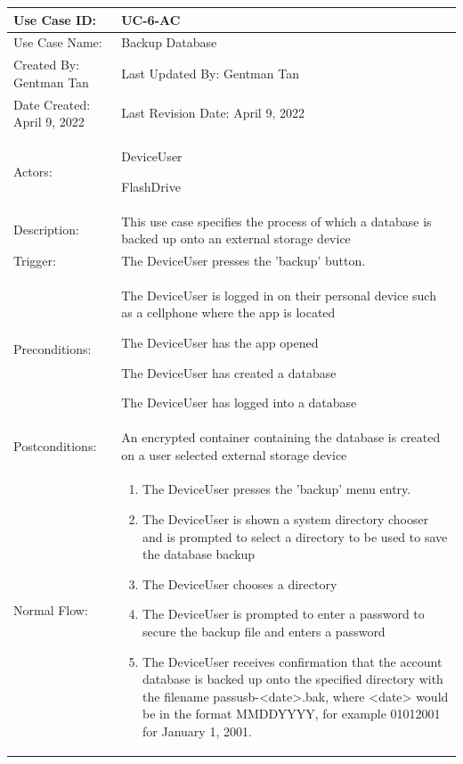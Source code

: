 \documentclass[stu]{apa7}
\newcommand{\nextitem}{\par\hspace*{\labelsep}\textbullet\hspace*{\labelsep}}
\begin{document}
\scriptsize{\begin{xltabular}{\textwidth}{|l|X|}
  \hline Use Case ID: & UC-6-AC \\ \hline

  Use Case Name: & Backup Database \\ \hline

  Created By: Gentman Tan & Last Updated By: Gentman Tan\\ \hline

  Date Created: April 9, 2022 & Last Revision Date: April 9, 2022 \\ \hline

  Actors: & \nextitem DeviceUser \nextitem FlashDrive  \\ \hline

  Description: & This use case specifies the process of which a database is backed up onto an external storage device \\ \hline

  Trigger: & The DeviceUser presses the 'backup' button. \\ \hline

  Preconditions: & \nextitem The DeviceUser is logged in on their personal device such as a cellphone where the app is located \nextitem The DeviceUser has the app opened \nextitem The DeviceUser has created a database \nextitem The DeviceUser has logged into a database \\ \hline

  Postconditions: & \nextitem An encrypted container containing the database is created on a user selected external storage device  \\ \hline

  Normal Flow: &
    \begin{enumerate}
      \item The DeviceUser presses the 'backup' menu entry.
      \item The DeviceUser is shown a system directory chooser and is prompted to select a directory to be used to save the database backup
      \item The DeviceUser chooses a directory
      \item The DeviceUser is prompted to enter a password to secure the backup file and enters a password
      \item The DeviceUser receives confirmation that the account database is backed up onto the specified directory with the filename passusb-<date>.bak, where <date> would be in the format MMDDYYYY, for example 01012001 for January 1, 2001.
    \end{enumerate} \\ \hline


\end{xltabular}}
\end{document}
